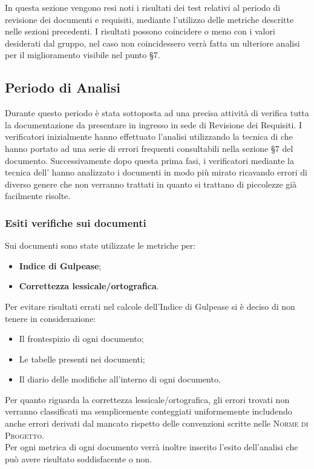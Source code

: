 \documentclass[../piano-di-qualifica.tex]{subfiles}
\begin{document}
In questa sezione vengono resi noti i risultati dei test relativi al periodo di revisione dei documenti e requisiti, mediante l'utilizzo delle metriche descritte nelle sezioni precedenti.
I risultati possono coincidere o meno con i valori desiderati dal gruppo, nel caso non coincidessero verrà fatta un ulteriore analisi per il miglioramento visibile nel punto §7.

\subsection{Periodo di Analisi}
\label{sub:periodo_di_analisi}
Durante questo periodo è stata sottoposta ad una precisa attività di verifica tutta la documentazione da presentare in ingresso in sede di Revisione dei Requisiti.
I verificatori inizialmente hanno effettuato l'analisi utilizzando la tecnica di  che hanno portato ad una serie di errori frequenti consultabili nella sezione §7 del documento.
Successivamente dopo questa prima fasi, i verificatori mediante la tecnica dell' hanno analizzato i documenti in modo più mirato ricavando errori di diverso genere che non verranno trattati in quanto si trattano di piccolezze già facilmente risolte.

\subsubsection{Esiti verifiche sui documenti}
\label{sub:esiti_verifiche_sui_documenti}
Sui documenti sono state utilizzate le metriche per:
    \begin{itemize}
        \item \textbf{Indice di Gulpease};
        \item \textbf{Correttezza lessicale/ortografica}.
    \end{itemize}
Per evitare risultati errati nel calcole dell'Indice di Gulpease si è deciso di non tenere in considerazione:
    \begin{itemize}
        \item Il frontespizio di ogni documento;
        \item Le tabelle presenti nei documenti;
        \item Il diario delle modifiche all'interno di ogni documento.
    \end{itemize}
Per quanto riguarda la correttezza lessicale/ortografica, gli errori trovati non verranno classificati ma semplicemente conteggiati uniformemente includendo anche errori derivati dal mancato rispetto delle convenzioni scritte nelle \textsc{Norme di Progetto}.
\\ Per ogni metrica di ogni documento verrà inoltre inserito l'esito dell'analisi che può avere risultato soddisfacente o non.
\end{document}
